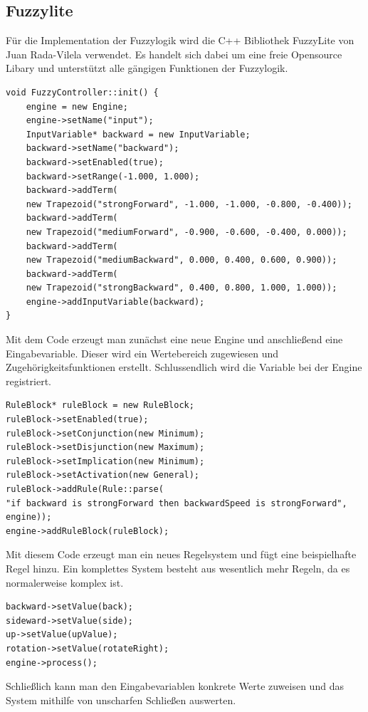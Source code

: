 \subsection{Fuzzylite}
Für die Implementation der Fuzzylogik wird die C++ Bibliothek FuzzyLite von Juan Rada-Vilela verwendet. Es handelt sich dabei um eine freie Opensource Libary und unterstützt alle gängigen Funktionen der Fuzzylogik.\cite{fuzzylite}  %
\begin{lstlisting}[caption=Beispielcode zur Erzeugung eines neuen Fuzzymodells]
void FuzzyController::init() {
	engine = new Engine;
	engine->setName("input");
	InputVariable* backward = new InputVariable;
	backward->setName("backward");
	backward->setEnabled(true);
	backward->setRange(-1.000, 1.000);
	backward->addTerm(
	new Trapezoid("strongForward", -1.000, -1.000, -0.800, -0.400));
	backward->addTerm(
	new Trapezoid("mediumForward", -0.900, -0.600, -0.400, 0.000));
	backward->addTerm(
	new Trapezoid("mediumBackward", 0.000, 0.400, 0.600, 0.900));
	backward->addTerm(
	new Trapezoid("strongBackward", 0.400, 0.800, 1.000, 1.000));
	engine->addInputVariable(backward);
}
\end{lstlisting}
Mit dem Code erzeugt man zunächst eine neue Engine und anschließend eine Eingabevariable. Dieser wird ein Wertebereich zugewiesen und Zugehörigkeitsfunktionen erstellt. Schlussendlich wird die Variable bei der Engine registriert. 
\begin{lstlisting}[caption=Code zur Erzeugung von einem Regelsystem]
RuleBlock* ruleBlock = new RuleBlock;
ruleBlock->setEnabled(true);
ruleBlock->setConjunction(new Minimum);
ruleBlock->setDisjunction(new Maximum);
ruleBlock->setImplication(new Minimum);
ruleBlock->setActivation(new General);
ruleBlock->addRule(Rule::parse(
"if backward is strongForward then backwardSpeed is strongForward",
engine));
engine->addRuleBlock(ruleBlock);
\end{lstlisting}
Mit diesem Code erzeugt man ein neues Regelsystem und fügt eine beispielhafte Regel hinzu. Ein komplettes System besteht aus wesentlich mehr Regeln, da es normalerweise komplex ist.
\begin{lstlisting}[caption=Code zur Auswertung des Regelsystems]
backward->setValue(back);
sideward->setValue(side);
up->setValue(upValue);
rotation->setValue(rotateRight);
engine->process();
\end{lstlisting}
Schließlich kann man den Eingabevariablen konkrete Werte zuweisen und das System mithilfe von unscharfen Schließen auswerten.


